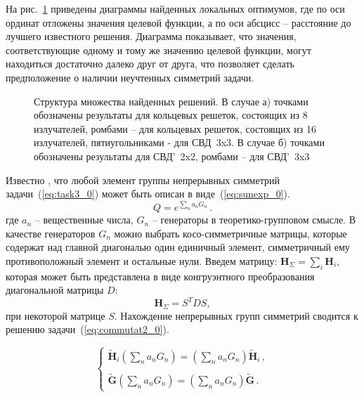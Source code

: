 На рис.~\ref{ris:fit_dist_0} приведены диаграммы найденных локальных оптимумов, где по оси ординат отложены значения целевой функции, а по оси абсцисс -- расстояние до лучшего известного решения. Диаграмма показывает, что значения, соответствующие одному и тому же значению целевой функции, могут находиться достаточно далеко друг от друга, что позволяет сделать предположение о наличии неучтенных симметрий задачи.

\begin{figure}
\centering
    \begin{minipage}[h]{0.8\linewidth}
    \end{minipage}
    \begin{minipage}[h]{\linewidth}
    \end{minipage}
    \vspace{0.7em}
    \caption{Структура множества найденных решений. В случае а) точками обозначены результаты для кольцевых решеток, состоящих из 8 излучателей, ромбами -- для кольцевых решеток, состоящих из 16 излучателей, пятиугольниками - для СВД~3x3. В случае б) точками обозначены результаты для СВД'~2x2, ромбами -- для СВД'~3x3}
    \label{ris:fit_dist_0}
\end{figure}

Известно , что любой элемент группы непрерывных симметрий задачи~(\ref{eq:task3_0}) может быть описан в виде~(\ref{eq:sunexp_0}).
\begin{equation}
\label{eq:sunexp_0}
Q=e^{\sum\limits_n a_n G_n} \, .
\end{equation}
где $a_n$ -- вещественные числа, $G_n$ -- генераторы в теоретико-групповом смысле. В качестве генераторов $G_n$ можно выбрать косо-симметричные матрицы, которые содержат над главной диагональю один единичный элемент, симметричный ему противоположный элемент и остальные нули.
Введем матрицу: $ {\textbf{H}}_{\Sigma} = \sum_{i} \textbf{H}_i,$ которая может быть представлена в виде конгруэнтного преобразования диагональной матрицы $D$:
$${\textbf{H}}_{\Sigma} = S^TDS,$$
при некоторой матрице $S$.
Нахождение непрерывных групп симметрий сводится к решению задачи~(\ref{eq:commutat2_0}).

\begin{equation}
\label{eq:commutat2_0}
\left\{
\begin{array}{l}
\displaystyle
\tilde{\textbf{H}}_i \left(\sum\limits_na_nG_n\right) =
\left(\sum\limits_na_nG_n\right)\tilde{\textbf{H}}_i \, , \\ \\
\displaystyle
\tilde{\textbf{G}} \left(\sum\limits_na_nG_n\right) = \left(\sum\limits_na_nG_n\right)\tilde{\textbf{G}} \, .
\end{array}
\right.
\end{equation}

